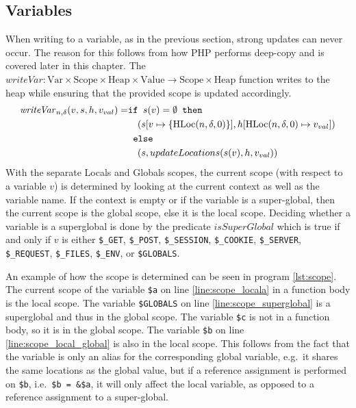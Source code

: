\subsection{Variables}
When writing to a variable, as in the previous section, strong updates can never occur. The reason for this follows from how PHP performs deep-copy and is covered later in this chapter. The $\mathit{writeVar}: \text{Var} \times \text{Scope} \times \text{Heap} \times \text{Value} \rightarrow \text{Scope} \times \text{Heap}$ function writes to the heap while ensuring that the provided scope is updated accordingly. 
\begin{align}
\mathit{writeVar}_{n,\delta}(v,s,h,v_{val}) =  &\texttt{if }s(v) = \emptyset\texttt{ then } \notag\\
                            &\quad (s[v\mapsto\{\text{HLoc}(n,\delta, 0)\}],h[\text{HLoc}(n,\delta, 0)\mapsto v_{val}]) \notag\\
                            & \texttt{ else } \notag\\
                            &\quad (s, updateLocations(s(v), h, v_{val}))
\end{align}
With the separate Locals and Globals scopes, the current scope (with respect to a variable $v$) is determined by looking at the current context as well as the variable name. If the context is empty or if the variable is a super-global, then the current scope is the global scope, else it is the local scope. Deciding whether a variable is a superglobal is done by the predicate $\mathit{isSuperGlobal}$ which is true if and only if $v$ is either \texttt{\$\_GET}, \texttt{\$\_POST}, \texttt{\$\_SESSION}, \texttt{\$\_COOKIE}, \texttt{\$\_SERVER}, \texttt{\$\_REQUEST}, \texttt{\$\_FILES}, \texttt{\$\_ENV}, or \texttt{\$GLOBALS}.

An example of how the scope is determined can be seen in program \ref{lst:scope}. The current scope of the variable \texttt{\$a} on line \ref{line:scope_locala} in a function body is the local scope. The variable \texttt{\$GLOBALS} on line \ref{line:scope_superglobal} is a superglobal and thus in the global scope. The variable \texttt{\$c} is not in a function body, so it is in the global scope. The variable \texttt{\$b} on line \ref{line:scope_local_global} is also in the local scope. This follows from the fact that the variable is only an alias for the corresponding global variable, e.g.\ it shares the same locations as the global value, but if a reference assignment is performed on \texttt{\$b}, i.e.\ \texttt{\$b = \&\$a}, it will only affect the local variable, as opposed to a reference assignment to a super-global.

